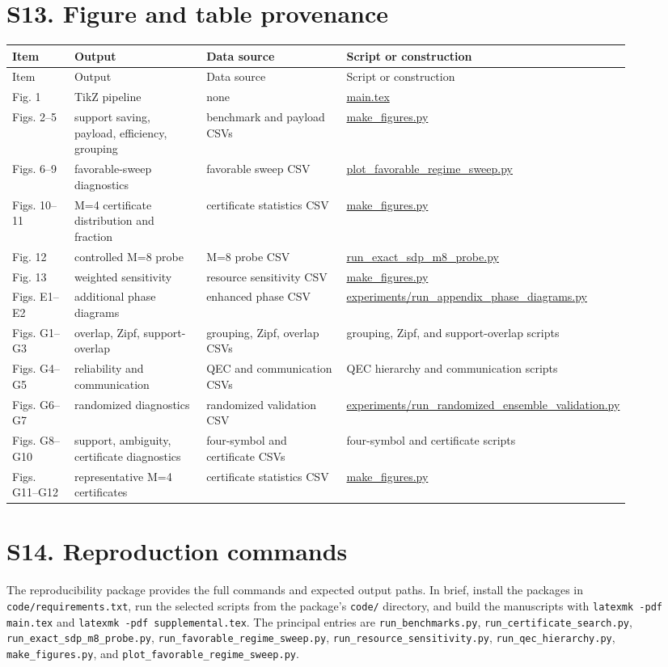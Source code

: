 \documentclass[10pt]{article}
\newcommand{\suppsection}[1]{\section*{#1}}
\begin{document}
\suppsection{S13. Figure and table provenance}
\begin{center}\scriptsize
\begin{longtable}{P{0.12\linewidth}P{0.25\linewidth}P{0.27\linewidth}P{0.25\linewidth}}
\toprule Item & Output & Data source & Script or construction\\ \midrule\endfirsthead
\toprule Item & Output & Data source & Script or construction\\ \midrule\endhead
Fig. 1 & TikZ pipeline & none & \url{main.tex}\\
Figs. 2--5 & support saving, payload, efficiency, grouping & benchmark and payload CSVs & \url{make_figures.py}\\
Figs. 6--9 & favorable-sweep diagnostics & favorable sweep CSV & \url{plot_favorable_regime_sweep.py}\\
Figs. 10--11 & M=4 certificate distribution and fraction & certificate statistics CSV & \url{make_figures.py}\\
Fig. 12 & controlled M=8 probe & M=8 probe CSV & \url{run_exact_sdp_m8_probe.py}\\
Fig. 13 & weighted sensitivity & resource sensitivity CSV & \url{make_figures.py}\\
Figs. E1--E2 & additional phase diagrams & enhanced phase CSV & \url{experiments/run_appendix_phase_diagrams.py}\\
Figs. G1--G3 & overlap, Zipf, support-overlap & grouping, Zipf, overlap CSVs & grouping, Zipf, and support-overlap scripts\\
Figs. G4--G5 & reliability and communication & QEC and communication CSVs & QEC hierarchy and communication scripts\\
Figs. G6--G7 & randomized diagnostics & randomized validation CSV & \url{experiments/run_randomized_ensemble_validation.py}\\
Figs. G8--G10 & support, ambiguity, certificate diagnostics & four-symbol and certificate CSVs & four-symbol and certificate scripts\\
Figs. G11--G12 & representative M=4 certificates & certificate statistics CSV & \url{make_figures.py}\\
\bottomrule
\end{longtable}
\end{center}

\suppsection{S14. Reproduction commands}
The reproducibility package provides the full commands and expected output paths. In brief, install the packages in \texttt{code/requirements.txt}, run the selected scripts from the package's \texttt{code/} directory, and build the manuscripts with \texttt{latexmk -pdf main.tex} and \texttt{latexmk -pdf supplemental.tex}. The principal entries are \texttt{run\_benchmarks.py}, \texttt{run\_certificate\_search.py}, \texttt{run\_exact\_sdp\_m8\_probe.py}, \texttt{run\_favorable\_regime\_sweep.py}, \texttt{run\_resource\_sensitivity.py}, \texttt{run\_qec\_hierarchy.py}, \texttt{make\_figures.py}, and \texttt{plot\_favorable\_regime\_sweep.py}.
\end{document}
